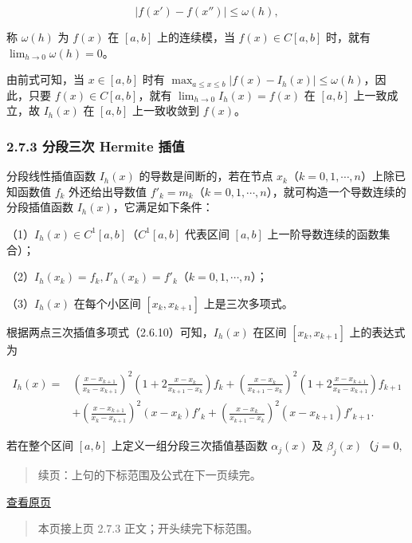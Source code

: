 \documentclass[
  10pt,
  fontset=fandol]{ctexart}
\begin{document}
\[|f(x')-f(x'')|\leqslant\omega(h),\]

称 \(\omega(h)\) 为 \(f(x)\) 在 \([a,b]\) 上的连续模，当 \(f(x)\in C[a,b]\) 时，就有 \(\lim_{h\to0}\omega(h)=0\)。

由前式可知，当 \(x\in[a,b]\) 时有 \(\max_{a\leqslant x\leqslant b}|f(x)-I_h(x)|\leqslant\omega(h)\)，因此，只要 \(f(x)\in C[a,b]\)，就有 \(\lim_{h\to0}I_h(x)=f(x)\) 在 \([a,b]\) 上一致成立，故 \(I_h(x)\) 在 \([a,b]\) 上一致收敛到 \(f(x)\)。

\subsubsection{2.7.3 分段三次 Hermite 插值}\label{ux5206ux6bb5ux4e09ux6b21-hermite-ux63d2ux503c}

分段线性插值函数 \(I_h(x)\) 的导数是间断的，若在节点 \(x_k\)（\(k=0,1,\cdots,n\)）上除已知函数值 \(f_k\) 外还给出导数值 \(f'_k=m_k\)（\(k=0,1,\cdots,n\)），就可构造一个导数连续的分段插值函数 \(I_h(x)\)，它满足如下条件：

（1）\(I_h(x)\in C^1[a,b]\)（\(C^1[a,b]\) 代表区间 \([a,b]\) 上一阶导数连续的函数集合）；

（2）\(I_h(x_k)=f_k,I'_h(x_k)=f'_k\)（\(k=0,1,\cdots,n\)）；

（3）\(I_h(x)\) 在每个小区间 \([x_k,x_{k+1}]\) 上是三次多项式。

根据两点三次插值多项式（2.6.10）可知，\(I_h(x)\) 在区间 \([x_k,x_{k+1}]\) 上的表达式为

\[\begin{aligned}
I_h(x)={}&\left(\frac{x-x_{k+1}}{x_k-x_{k+1}}\right)^2\left(1+2\frac{x-x_k}{x_{k+1}-x_k}\right)f_k+\left(\frac{x-x_k}{x_{k+1}-x_k}\right)^2\left(1+2\frac{x-x_{k+1}}{x_k-x_{k+1}}\right)f_{k+1}\\
&+\left(\frac{x-x_{k+1}}{x_k-x_{k+1}}\right)^2(x-x_k)f'_k+\left(\frac{x-x_k}{x_{k+1}-x_k}\right)^2(x-x_{k+1})f'_{k+1}.
\end{aligned}\tag{2.7.5}\]

若在整个区间 \([a,b]\) 上定义一组分段三次插值基函数 \(\alpha_j(x)\) 及 \(\beta_j(x)\)（\(j=0,\)

\begin{quote}
续页：上句的下标范围及公式在下一页续完。
\end{quote}

\href{../../source-images/pdf-048.jpeg}{查看原页}

\begin{quote}
本页接上页 2.7.3 正文；开头续完下标范围。
\end{quote}
\end{document}
